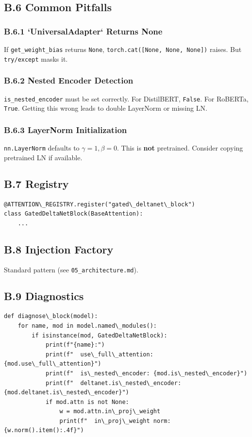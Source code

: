 \subsection{B.6 Common Pitfalls}

\subsubsection{B.6.1 `UniversalAdapter` Returns None}

If \texttt{get\_weight\_bias} returns \texttt{None}, \texttt{torch.cat([None, None, None])} raises. 
But \texttt{try/except} masks it.

\subsubsection{B.6.2 Nested Encoder Detection}

\texttt{is\_nested\_encoder} must be set correctly. For DistilBERT, \texttt{False}. For 
RoBERTa, \texttt{True}. Getting this wrong leads to double LayerNorm or missing LN.

\subsubsection{B.6.3 LayerNorm Initialization}

\texttt{nn.LayerNorm} defaults to $\gamma = 1, \beta = 0$. This is \textbf{not} 
pretrained. Consider copying pretrained LN if available.

\subsection{B.7 Registry}

\begin{lstlisting}
@ATTENTION\_REGISTRY.register("gated\_deltanet\_block")
class GatedDeltaNetBlock(BaseAttention):
    ...
\end{lstlisting}

\subsection{B.8 Injection Factory}

Standard pattern (see \texttt{05\_architecture.md}).

\subsection{B.9 Diagnostics}

\begin{lstlisting}
def diagnose\_block(model):
    for name, mod in model.named\_modules():
        if isinstance(mod, GatedDeltaNetBlock):
            print(f"{name}:")
            print(f"  use\_full\_attention: {mod.use\_full\_attention}")
            print(f"  is\_nested\_encoder: {mod.is\_nested\_encoder}")
            print(f"  deltanet.is\_nested\_encoder: {mod.deltanet.is\_nested\_encoder}")
            if mod.attn is not None:
                w = mod.attn.in\_proj\_weight
                print(f"  in\_proj\_weight norm: {w.norm().item():.4f}")
\end{lstlisting}

